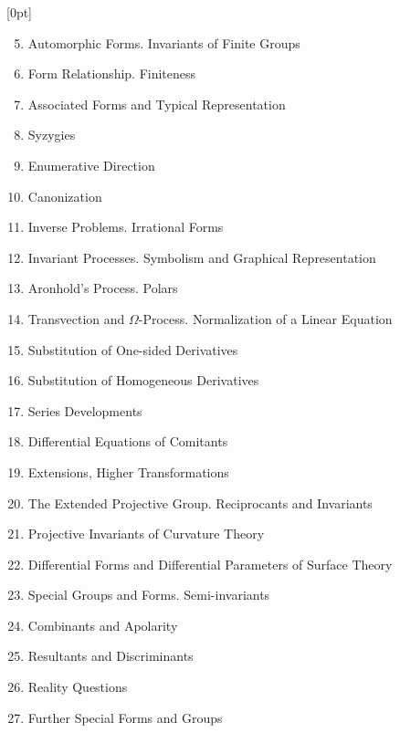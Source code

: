 \thispagestyle{fancy}

\vspace{0.5cm}


[0pt]
  {}
  {\numberline{}\makebox[1.5cm][l]{\thesubsection}}
  {}
  {\contentspage}

\fontsize{6}{0}\selectfont 
\bfseries 

\begin{enumerate}[itemsep=0pt]
    \setcounter{enumi}{4}
    \item Automorphic Forms. Invariants of Finite Groups
    \item Form Relationship. Finiteness
    \item Associated Forms and Typical Representation
    \item Syzygies
    \item Enumerative Direction
    \item Canonization
    \item Inverse Problems. Irrational Forms
    \item Invariant Processes. Symbolism and Graphical Representation
    \item Aronhold's Process. Polars
    \item Transvection and $\Omega$-Process. Normalization of a Linear Equation
    \item Substitution of One-sided Derivatives
    \item Substitution of Homogeneous Derivatives
    \item Series Developments
    \item Differential Equations of Comitants
    \item Extensions, Higher Transformations
    \item The Extended Projective Group. Reciprocants and Invariants
    \item Projective Invariants of Curvature Theory
    \item Differential Forms and Differential Parameters of Surface Theory
    \item Special Groups and Forms. Semi-invariants
    \item Combinants and Apolarity
    \item Resultants and Discriminants
    \item Reality Questions
    \item Further Special Forms and Groups
\end{enumerate}

